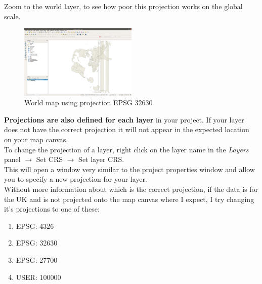 Zoom to the world layer, to see how poor this projection works on the global scale.

\begin{figure}[!h]
	\centering
	\includegraphics[width=0.5\textwidth]{images/world_map_EPSG32630.png}
	\caption{World map using projection EPSG 32630}
	\label{ft_fig_firstfig3}
\end{figure}

\textbf{Projections are also defined for each layer} in your project. If your layer does not have the correct projection it will not appear in the expected location on your map canvas.\\

To change the projection of a layer, right click on the layer name in the \emph{Layers} panel $\rightarrow$ Set CRS $\rightarrow$ Set layer CRS.\\

This will open a window very similar to the project properties window and allow you to specify a new projection for your layer.\\

Without more information about which is the correct projection, if the data is for the UK and is not projected onto the map canvas where I expect, I try changing it's projections to one of these:
\begin{enumerate}
	\item EPSG: 4326
	\item EPSG: 32630
	\item EPSG: 27700
	\item USER: 100000
\end{enumerate}

